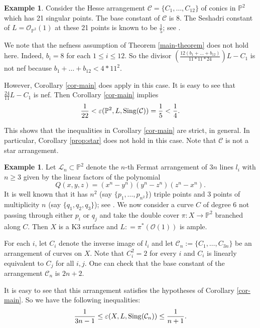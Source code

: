 \documentclass[12pt,reqno]{amsart}
\theoremstyle{plain}
\numberwithin{equation}{section}
\theoremstyle{definition}
\newtheorem{example}[theorem]{Example}
\begin{document}
\begin{example}\label{hesse}
Consider the Hesse arrangement $\mathcal{C} = \{C_1, \ldots, C_{12}\}$  of conics in $\mathbb{P}^2$
which has 21 singular points.  The base constant of $\mathcal{C}$  is 8.  
 The Seshadri constant of $L = \mathcal{O}_{\mathbb{P}^2}(1)$ at these 21 points is known to be $\frac{1}{5}$; see \cite[Example 3.5]{JP}. 

We note that the nefness assumption of Theorem \ref{main-theorem} does not hold here. Indeed, $b_i = 8$ for each $1 \le i \le 12$. So the divisor 
$\left(\frac{12(b_1+\dots + b_{12})}{11*11*24}\right)L - C_1$ is not nef because 
$b_1+\dots + b_{12} < 4*11^2$. 

However, Corollary \ref{cor-main} does apply in this case. 
It is easy to see that $\frac{24}{11}L - C_1$ is nef. 
Then Corollary \ref{cor-main} implies
$$\frac{1}{22} <  \varepsilon(\mathbb{P}^2, L,{\rm Sing}(\mathcal{C})) = \frac{1}{5}<  \frac{1}{4}.$$

This shows that the inequalities in Corollary \ref{cor-main} are strict, in general. In particular,  Corollary \ref{prop:star} does not hold in this case. Note that $\mathcal{C}$ is not a star arrangement.   





\end{example}



\begin{example}
		Let $\mathcal{L}_n \subset \mathbb{P}^2$ denote the $n$-th Fermat arrangement of $3n$ lines $l_i$ with $n \geq 3$ given by the linear factors of the polynomial 
		\[
		Q(x,y,z)=(x^n-y^n)(y^n-z^n)(z^n-x^n).
		\]
		It is well known that it has $n^2$ (say $\{p_1,\ldots,p_{n^2}\}$) triple points and $3$ points of multiplicity $n$ (say $\{q_1,q_2,q_3\}$); see \cite[Example II.6]{U}.  We now consider a 
		curve $C$ of degree $6$ not passing through either $p_i$ or $q_j$ and take the double cover 
				$\pi : X \longrightarrow \mathbb{P}^2$
		branched along $C$. Then $X$ is a K3 surface  and $L : = \pi^*(\mathcal{O}(1))$ is ample. 

For each $i$, let $C_i$ denote the inverse image of $l_i$ and let 
$\mathcal{C}_n := \{C_1,\ldots, C_{3n}\}$ be an arrangement of curves on $X$. Note that $C_i^2 = 2$ for every $i$ and 
$C_i$ is linearly equivalent to $C_j$ for all $i,j$. 
One can check that the base constant of the arrangement $\mathcal{C}_n$ is $2n+2$. 

It is easy to see that this arrangement satisfies the hypotheses of Corollary \ref{cor-main}. 
So we have the following inequalities:
$$\frac{1}{3n-1} \le \varepsilon(X, L,{\rm Sing}(\mathcal{C}_n)) \le \frac{1}{n+1}.$$



\end{example}
\end{document}
